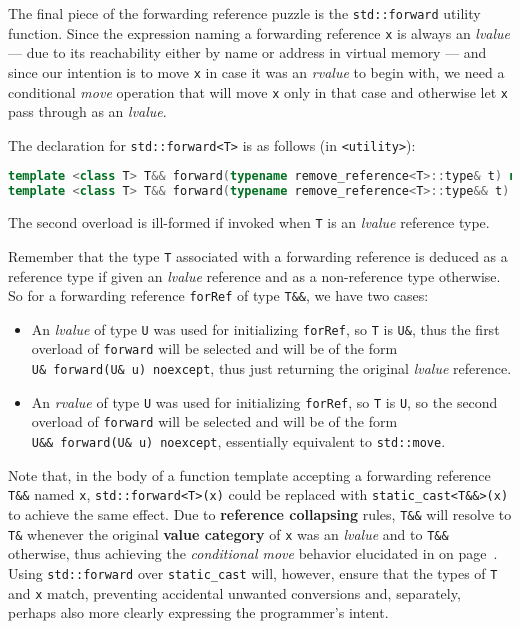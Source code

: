 The final piece of the forwarding reference puzzle is the
\texttt{std::forward} utility function. Since the expression naming a
forwarding reference \texttt{x} is always an \emph{lvalue} --- due to its
reachability either by name or address in virtual memory --- and since our
intention is to move \texttt{x} in case it was an \emph{rvalue} to begin
with, we need a conditional \emph{move} operation that will move
\texttt{x} only in that case and otherwise let \texttt{x} pass through as
an \emph{lvalue}.

The declaration for \texttt{std::forward<T>} is as follows (in
\texttt{<utility>}):

\begin{lstlisting}[language=C++]
template <class T> T&& forward(typename remove_reference<T>::type& t) noexcept;
template <class T> T&& forward(typename remove_reference<T>::type&& t) noexcept;
\end{lstlisting}

\noindent The second overload is ill-formed if invoked when \texttt{T} is an
\emph{lvalue} reference type.

Remember that the type \texttt{T} associated with a forwarding reference
is deduced as a reference type if given an \emph{lvalue} reference and
as a non-reference type otherwise. So for a forwarding reference
\texttt{forRef} of type \texttt{T\&\&}, we have two cases:
\begin{itemize}
\item{An \emph{lvalue} of type \texttt{U} was used for initializing \texttt{forRef}, so \texttt{T} is \texttt{U\&}, thus the first overload of \texttt{forward} will be selected and will be of the form \texttt{U\&}~\texttt{forward(U\&}~\texttt{u)}~\texttt{noexcept}, thus just returning the original \emph{lvalue} reference.}
\item{An \emph{rvalue} of type \texttt{U} was used for initializing \texttt{forRef}, so \texttt{T} is \texttt{U}, so the second overload of \texttt{forward} will be selected and will be of the form \texttt{U\&\&}~\texttt{forward(U\&}~\texttt{u)}~\texttt{noexcept}, essentially equivalent to \texttt{std::move}.}
\end{itemize}
Note that, in the body of a function template accepting a forwarding
reference \texttt{T\&\&} named \texttt{x}, \texttt{std::forward<T>(x)}
could be replaced with \texttt{static\_cast<T\&\&>(x)} to achieve the
same effect. Due to \textbf{reference collapsing} rules, \texttt{T\&\&}
will resolve to \texttt{T\&} whenever the original \textbf{value
category} of \texttt{x} was an \emph{lvalue} and to \texttt{T\&\&}
otherwise, thus achieving the \emph{conditional move} behavior
elucidated in \textit{} on page~\pageref{description-forwardingref}. Using \texttt{std::forward} over \texttt{static\_cast}
will, however, ensure that the types of \texttt{T} and \texttt{x} match,
preventing accidental unwanted conversions and, separately, perhaps also
more clearly expressing the programmer's intent.

